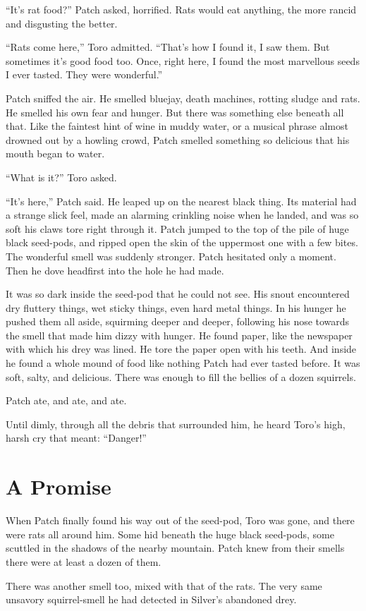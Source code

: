 \documentclass[ebook,oneside,openany,17pt]{memoir}
\renewcommand{\thechapter}{\Roman{chapter}}
\newcounter{sections}
\newcommand{\sections}[1]{%
  \section*{#1}
  \addtocounter{sections}{1}%
  \pdfbookmark[1]{#1}{section.\thechapter.\thesections}}
\begin{document}
“It’s rat food?” Patch asked, horrified. Rats would eat anything, the
more rancid and disgusting the better.

“Rats come here,” Toro admitted. “That’s how I found it, I saw
them. But sometimes it’s good food too. Once, right here, I found the
most marvellous seeds I ever tasted. They were wonderful.”

Patch sniffed the air. He smelled bluejay, death machines, rotting
sludge and rats. He smelled his own fear and hunger. But there was
something else beneath all that. Like the faintest hint of wine in
muddy water, or a musical phrase almost drowned out by a howling
crowd, Patch smelled something so delicious that his mouth began to
water.

“What is it?” Toro asked.

“It’s here,” Patch said. He leaped up on the nearest black thing. Its
material had a strange slick feel, made an alarming crinkling noise
when he landed, and was so soft his claws tore right through it. Patch
jumped to the top of the pile of huge black seed-pods, and ripped open
the skin of the uppermost one with a few bites. The wonderful smell
was suddenly stronger. Patch hesitated only a moment. Then he dove
headfirst into the hole he had made.

It was so dark inside the seed-pod that he could not see. His snout
encountered dry fluttery things, wet sticky things, even hard metal
things. In his hunger he pushed them all aside, squirming deeper and
deeper, following his nose towards the smell that made him dizzy with
hunger. He found paper, like the newspaper with which his drey was
lined. He tore the paper open with his teeth. And inside he found a
whole mound of food like nothing Patch had ever tasted before. It was
soft, salty, and delicious. There was enough to fill the bellies of a
dozen squirrels.

Patch ate, and ate, and ate.

Until dimly, through all the debris that surrounded him, he heard
Toro’s high, harsh cry that meant: “Danger!”


\sections{A Promise}

When Patch finally found his way out of the seed-pod, Toro was gone,
and there were rats all around him. Some hid beneath the huge black
seed-pods, some scuttled in the shadows of the nearby mountain. Patch
knew from their smells there were at least a dozen of them.

There was another smell too, mixed with that of the rats. The very
same unsavory squirrel-smell he had detected in Silver’s abandoned
drey.
\end{document}
